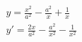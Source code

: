 \begin{ex}
\begin{align}
&y=\frac{x^2}{a^2}-\frac{a^2}{x}+\frac{1}{x}\nonumber\\
&y'=\frac{2x}{a^2}-\frac{a^2}{x^2}-\frac{1}{x^2}\nonumber
\end{align}
\end{ex}